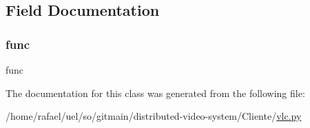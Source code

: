 \subsection{Field Documentation}
\mbox{\label{classvlc_1_1memoize__parameterless_a3699148440db7bdde6e95e16092363d1}} 
\subsubsection{\texorpdfstring{func}{func}}
{\footnotesize\ttfamily func}



The documentation for this class was generated from the following file\+:\begin{DoxyCompactItemize}
\item 
/home/rafael/uel/so/gitmain/distributed-\/video-\/system/\+Cliente/\hyperlink{vlc_8py}{vlc.\+py}\end{DoxyCompactItemize}
